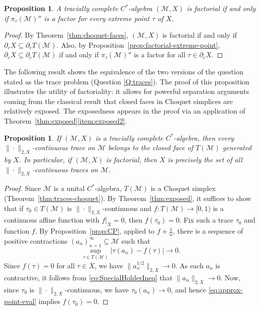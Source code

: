 \documentclass[a4paper,11pt]{amsart}
\newtheorem{proposition}[theorem]{Proposition}
\theoremstyle{definition}
\numberwithin{equation}{section}
\numberwithin{theorem}{section}
\newcommand{\M}{\mathcal{M}}
\begin{document}
\begin{proposition}\label{prop:factorial}
	A tracially complete $C^*$-algebra $(\M, X)$ is factorial if and only if $\pi_\tau(\M)''$ is a factor for every extreme point $\tau$ of $X$.
\end{proposition}

\begin{proof}
	By Theorem~\ref{thm:choquet-faces}, $(\mathcal M, X)$ is factorial if and only if $\partial_e X \subseteq \partial_e T(\mathcal M)$.  Also, by Proposition~\ref{prop:factorial-extreme-point}, $\partial_e X \subseteq \partial_e T(\mathcal M)$ if and only if $\pi_\tau(\mathcal M)''$ is a factor for all $\tau \in \partial_e X$. 
\end{proof}







The following result shows the equivalence of the two versions of the question stated as the trace problem (Question \ref{Q:traces}).   The proof of this proposition illustrates the utility of factoriality: it allows for powerful separation arguments coming from the classical result that closed faces in Choquet simplices are relatively exposed.  The exposedness appears in the proof via an application of Theorem~\ref{thm:exposed}\ref{item:exposed2}.

\begin{proposition}\label{prop:face}
	If $(\M, X)$ is a tracially complete $C^*$-algebra, then every $\|\cdot\|_{2, X}$-continuous trace on $\M$ belongs to the closed face of $T(\M)$ generated by $X$.  In particular, if $(\M, X)$ is factorial, then $X$ is precisely the set of all $\|\cdot\|_{2, X}$-continuous traces on $\M$.
\end{proposition}

\begin{proof}
	Since $\M$ is a unital $C^*$-algebra, $T(\M)$ is a Choquet simplex (Theorem~\ref{thm:traces-choquet}). By Theorem~\ref{thm:exposed}, it suffices to show that if $\tau_0 \in T(\mathcal M)$ is $\|\cdot\|_{2, X}$-continuous and $f \colon T(\mathcal M) \rightarrow [0, 1)$ is a continuous affine function with $f|_X = 0$, then $f(\tau_0) = 0$.  Fix such a trace $\tau_0$ and function $f$.  By Proposition~\ref{prop:CP}, applied to $f + \frac1n$, there is a sequence of positive contractions $(a_n)_{n=1}^\infty \subseteq \M$ such that
	\begin{equation}
		\label{eq:approx-point-eval}
		\sup_{\tau \in T(\mathcal M)} |\tau(a_n) - f(\tau)| \rightarrow 0.
	\end{equation}
	Since $f(\tau) = 0$ for all $\tau \in X$, we have $\|a_n^{1/2}\|_{2, X} \rightarrow 0$.  As each $a_n$ is contractive, it follows from \eqref{eq:SpecialHolderIneq} that $\|a_n\|_{2, X} \rightarrow 0$.  Now, since $\tau_0$ is $\|\cdot\|_{2, X}$-continuous, we have $\tau_0(a_n) \rightarrow 0$, and hence \eqref{eq:approx-point-eval} implies $f(\tau_0) = 0$.
\end{proof}
\end{document}
